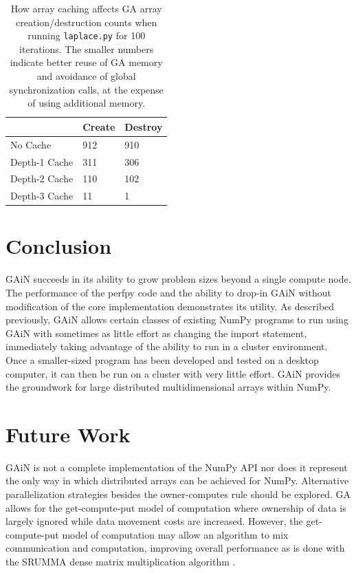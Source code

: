 \documentclass{sigplanconf}
\begin{document}
\begin{table}
\begin{center}
\begin{tabular}{l|l|l}
              & Create & Destroy \\
\hline
No Cache      & 912    & 910     \\
Depth-1 Cache & 311    & 306     \\
Depth-2 Cache & 110    & 102     \\
Depth-3 Cache &  11    &   1     \\
\end{tabular}
\caption{
How array caching affects GA array creation/destruction counts when running
\texttt{laplace.py} for 100 iterations. The smaller numbers indicate better
reuse of GA memory and avoidance of global synchronization calls, at the
expense of using additional memory.
}
\label{tab:cache}
\end{center}
\end{table}

\section{Conclusion}

GAiN succeeds in its ability to grow problem sizes beyond a single compute
node. The performance of the perfpy code and the ability to drop-in GAiN
without modification of the core implementation demonstrates its utility. As
described previously, GAiN allows certain classes of existing NumPy programs
to run using GAiN with sometimes as little effort as changing the import
statement, immediately taking advantage of the ability to run in a cluster
environment. Once a smaller-sized program has been developed and tested on a
desktop computer, it can then be run on a cluster with very little effort.
GAiN provides the groundwork for large distributed multidimensional arrays
within NumPy.

\section{Future Work}

GAiN is not a complete implementation of the NumPy API nor does it represent
the only way in which distributed arrays can be achieved for NumPy.
Alternative parallelization strategies besides the owner-computes rule should
be explored. GA allows for the get-compute-put model of computation where
ownership of data is largely ignored while data movement costs are increased.
However, the get-compute-put model of computation may allow an algorithm to
mix communication and computation, improving overall performance as is done
with the SRUMMA dense matrix multiplication algorithm \cite{Kri04}.
\end{document}
